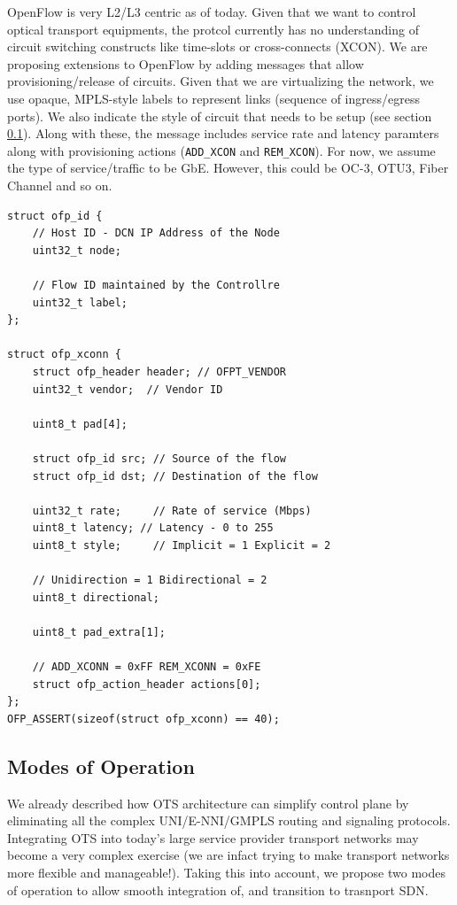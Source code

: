 \documentclass{sig-alternate-10pt}
\begin{document}
	OpenFlow \cite{OF1.0} is very L2/L3 centric as of today. Given that we want to control optical transport
	equipments, the protcol currently has no understanding of circuit switching constructs like time-slots or
	cross-connects (XCON). We are proposing extensions to OpenFlow by adding messages that allow provisioning/release of
	circuits. Given that we are virtualizing the network, we use opaque, MPLS-style labels to represent links
	(sequence of ingress/egress ports). We also indicate the style of circuit that needs to be setup (see
	section \ref{sec:modes}). Along with these, the message includes service rate and latency paramters along
	with provisioning actions (\texttt{ADD\_XCON} and \texttt{REM\_XCON}). For now, we assume the type of service/traffic 
	to be GbE. However, this could be OC-3, OTU3, Fiber Channel and so on.

	\begin{lstlisting}
struct ofp_id {
	// Host ID - DCN IP Address of the Node
	uint32_t node;

	// Flow ID maintained by the Controllre
	uint32_t label;
};

struct ofp_xconn {
	struct ofp_header header; // OFPT_VENDOR
	uint32_t vendor;  // Vendor ID

	uint8_t pad[4];
		  
	struct ofp_id src; // Source of the flow
	struct ofp_id dst; // Destination of the flow
		   
	uint32_t rate;     // Rate of service (Mbps)
	uint8_t latency; // Latency - 0 to 255
	uint8_t style;     // Implicit = 1 Explicit = 2

	// Unidirection = 1 Bidirectional = 2
	uint8_t directional;

	uint8_t pad_extra[1];

	// ADD_XCONN = 0xFF REM_XCONN = 0xFE
	struct ofp_action_header actions[0];
};
OFP_ASSERT(sizeof(struct ofp_xconn) == 40);
	\end{lstlisting}
	
	\subsection{Modes of Operation} \label{sec:modes}
	We already described how OTS architecture can simplify control plane by eliminating all the complex
	UNI/E-NNI/GMPLS routing and signaling protocols. Integrating OTS into today's large service provider transport
	networks may become a very complex exercise (we are infact trying to make transport networks more
	flexible and manageable!). Taking this into account, we propose two modes of operation to allow smooth
	integration of, and transition to trasnport SDN.
\end{document}
